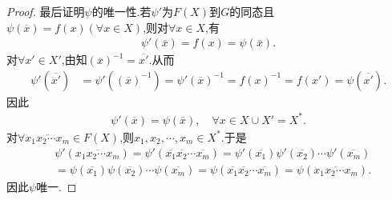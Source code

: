 \documentclass[../../main.tex]{subfiles}%
\begin{document}
\begin{proof}
最后证明$\psi$的唯一性.若$\psi'$为$F(X)$到$G$的同态且$\psi(\overline{x})=f(x)(\forall x\in X)$,则对$\forall x\in X$,有
\begin{align*}
\psi' \left( \overline{x} \right) =f\left( x \right) =\psi \left( \overline{x} \right) .
\end{align*}
对$\forall x'\in X'$,由知$\left( \overline{x} \right) ^{-1}=\overline{x'}.$从而
\begin{align*}
\psi' \left( \overline{x'} \right) &=\psi' \left( \left( \overline{x} \right) ^{-1} \right) =\psi' \left( \overline{x} \right) ^{-1}=f\left( x \right) ^{-1}=f\left( x' \right) =\psi \left( \overline{x'} \right) .
\end{align*}
因此
\begin{align*}
\psi' \left( \overline{x} \right) =\psi \left( \overline{x} \right) ,\quad \forall x\in X\cup X' =X^*.
\end{align*}
对$\forall \overline{x_1x_2\cdots x_m}\in F\left( X \right) $,则$x_1,x_2,\cdots ,x_m\in X^*.$于是
\begin{align*}
&\psi' \left( \overline{x_1x_2\cdots x_m} \right) =\psi' \left( \overline{x_1}\overline{x_2}\cdots \overline{x_m} \right) =\psi' \left( \overline{x_1} \right) \psi' \left( \overline{x_2} \right) \cdots \psi' \left( \overline{x_m} \right) \\
&=\psi \left( \overline{x_1} \right) \psi \left( \overline{x_2} \right) \cdots \psi \left( \overline{x_m} \right) =\psi \left( \overline{x_1}\overline{x_2}\cdots \overline{x_m} \right) =\psi \left( \overline{x_1x_2\cdots x_m} \right) .
\end{align*}
因此$\psi$唯一.
\end{proof}
\end{document}
